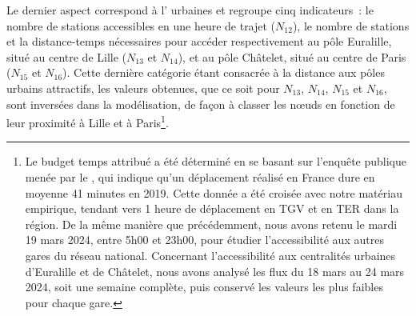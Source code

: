 \begin{refsegment}
Le dernier aspect correspond à l' urbaines et regroupe cinq indicateurs~: le nombre de stations accessibles en une heure de trajet (\(N_{12}\)), le nombre de stations et la distance-temps nécessaires pour accéder respectivement au pôle Euralille, situé au centre de Lille (\(N_{13}\) et \(N_{14}\)), et au pôle Châtelet, situé au centre de Paris (\(N_{15}\) et \(N_{16}\)). Cette dernière catégorie étant consacrée à la distance aux pôles urbains attractifs, les valeurs obtenues, que ce soit pour \(N_{13}\), \(N_{14}\), \(N_{15}\) et \(N_{16}\), sont inversées dans la modélisation, de façon à classer les nœuds en fonction de leur proximité à Lille et à Paris\footnote{
    Le budget temps attribué a été déterminé en se basant sur l'enquête publique menée par le \textcolor{blue}{\textcite{ministere_de_la_transition_ecologique_et_de_la_cohesion_des_territoires_mobilite_2023}}, qui indique qu'un déplacement  réalisé en France dure en moyenne 41 minutes en 2019. Cette donnée a été croisée avec notre matériau empirique, tendant vers 1 heure de déplacement en \acrshort{TGV} et en \acrshort{TER} dans la région. De la même manière que précédemment, nous avons retenu le mardi 19 mars 2024, entre 5h00 et 23h00, pour étudier l'accessibilité aux autres gares du réseau national. Concernant l'accessibilité aux centralités urbaines d'Euralille et de Châtelet, nous avons analysé les flux du 18 mars au 24 mars 2024, soit une semaine complète, puis conservé les valeurs les plus faibles pour chaque gare.
}.%


\end{refsegment}
